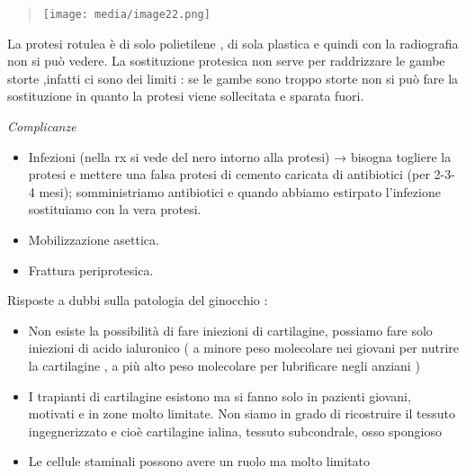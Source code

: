 \documentclass[]{article}
\begin{document}
\begin{quote}
\texttt{[image: media/image22.png]}
\end{quote}

La protesi rotulea è di solo polietilene , di sola plastica e quindi con
la radiografia non si può vedere. La sostituzione protesica non serve
per raddrizzare le gambe storte ,infatti ci sono dei limiti : se le
gambe sono troppo storte non si può fare la sostituzione in quanto la
protesi viene sollecitata e sparata fuori.

\emph{Complicanze }

\begin{itemize}
\item
  Infezioni (nella rx si vede del nero intorno alla protesi) → bisogna
  togliere la protesi e mettere una falsa protesi di cemento caricata di
  antibiotici (per 2-3-4 mesi); somministriamo antibiotici e quando
  abbiamo estirpato l'infezione sostituiamo con la vera protesi.
\item
  Mobilizzazione asettica.
\item
  Frattura periprotesica.
\end{itemize}

Risposte a dubbi sulla patologia del ginocchio :

\begin{itemize}
\item
  Non esiste la possibilità di fare iniezioni di cartilagine, possiamo
  fare solo iniezioni di acido ialuronico ( a minore peso molecolare nei
  giovani per nutrire la cartilagine , a più alto peso molecolare per
  lubrificare negli anziani )
\item
  I trapianti di cartilagine esistono ma si fanno solo in pazienti
  giovani, motivati e in zone molto limitate. Non siamo in grado di
  ricostruire il tessuto ingegnerizzato e cioè cartilagine ialina,
  tessuto subcondrale, osso spongioso
\item
  Le cellule staminali possono avere un ruolo ma molto limitato
\end{itemize}
\end{document}
